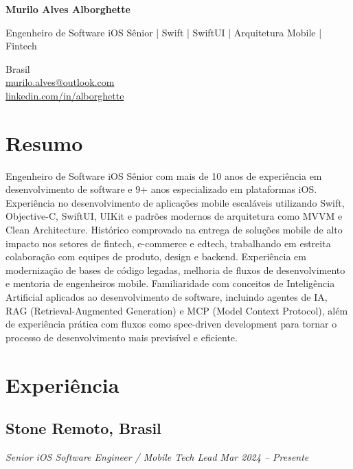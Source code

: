 \documentclass[a4paper,10pt]{article}
\begin{document}
\begin{center}
{\LARGE \textbf{Murilo Alves Alborghette}}

Engenheiro de Software iOS Sênior | Swift | SwiftUI | Arquitetura Mobile | Fintech
\end{center}

Brasil \\
\href{mailto:murilo.alves@outlook.com}{murilo.alves@outlook.com} \\
\href{https://www.linkedin.com/in/alborghette}{linkedin.com/in/alborghette}


\section{Resumo}

Engenheiro de Software iOS Sênior com mais de 10 anos de experiência em desenvolvimento de software e 9+ anos especializado em plataformas iOS. Experiência no desenvolvimento de aplicações mobile escaláveis utilizando Swift, Objective-C, SwiftUI, UIKit e padrões modernos de arquitetura como MVVM e Clean Architecture. Histórico comprovado na entrega de soluções mobile de alto impacto nos setores de fintech, e-commerce e edtech, trabalhando em estreita colaboração com equipes de produto, design e backend. Experiência em modernização de bases de código legadas, melhoria de fluxos de desenvolvimento e mentoria de engenheiros mobile. Familiaridade com conceitos de Inteligência Artificial aplicados ao desenvolvimento de software, incluindo agentes de IA, RAG (Retrieval-Augmented Generation) e MCP (Model Context Protocol), além de experiência prática com fluxos como spec-driven development para tornar o processo de desenvolvimento mais previsível e eficiente.


\section{Experiência}

\subsection*{\textbf{Stone} \hfill Remoto, Brasil}
\textit{Senior iOS Software Engineer / Mobile Tech Lead \hfill Mar 2024 – Presente}
\end{document}
